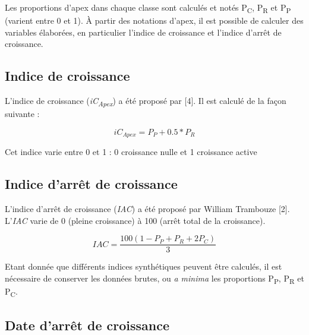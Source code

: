 \documentclass[
  a4paperpaper,
  DIV=11,
  numbers=noendperiod]{scrartcl}
\begin{document}
Les proportions d'apex dans chaque classe sont calculés et notés
P\textsubscript{C}, P\textsubscript{R} et P\textsubscript{P} (varient
entre 0 et 1). À partir des notations d'apex, il est possible de
calculer des variables élaborées, en particulier l'indice de croissance
et l'indice d'arrêt de croissance.

\subsection{Indice de croissance}\label{indice-de-croissance}

L'indice de croissance (\emph{iC\textsubscript{Apex}}) a été proposé par
{[}4{]}. Il est calculé de la façon suivante :

\[ iC_{Apex} = P_P + 0.5*P_R \]

Cet indice varie entre 0 et 1 : 0 croissance nulle et 1 croissance
active

\subsection{Indice d'arrêt de
croissance}\label{indice-darruxeat-de-croissance}

L'indice d'arrêt de croissance (\emph{IAC}) a été proposé par William
Trambouze {[}2{]}. L'\emph{IAC} varie de 0 (pleine croissance) à 100
(arrêt total de la croissance).

\[ IAC = \frac{100 (1-P_P + P_R + 2P_C)}{3} \]

\begin{tcolorbox}[enhanced jigsaw, leftrule=.75mm, bottomtitle=1mm, toptitle=1mm, colframe=quarto-callout-important-color-frame, toprule=.15mm, opacityback=0, colbacktitle=quarto-callout-important-color!10!white, arc=.35mm, breakable, bottomrule=.15mm, titlerule=0mm, title=\textcolor{quarto-callout-important-color}{\faExclamation}\hspace{0.5em}{Important}, left=2mm, rightrule=.15mm, opacitybacktitle=0.6, coltitle=black, colback=white]

Etant donnée que différents indices synthétiques peuvent être calculés,
il est nécessaire de conserver les données brutes, ou \emph{a minima}
les proportions P\textsubscript{P}, P\textsubscript{R} et
P\textsubscript{C}.

\end{tcolorbox}

\subsection{Date d'arrêt de
croissance}\label{date-darruxeat-de-croissance}
\end{document}
